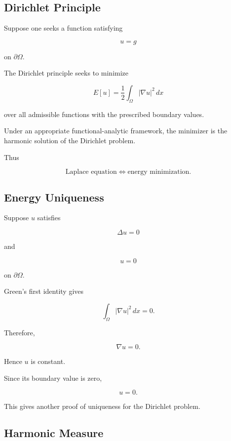 \subsection{Dirichlet Principle}
\label{subsec:potential-dirichlet-principle}

Suppose one seeks a function satisfying

\[
u=g
\]

on \(\partial\Omega\).

The Dirichlet principle seeks to minimize

\[
\boxed{
E[u]
=
\frac12
\int_\Omega
|\nabla u|^2\,dx
}
\]

over all admissible functions with the prescribed boundary values.

Under an appropriate functional-analytic framework, the minimizer is the
harmonic solution of the Dirichlet problem.

Thus

\[
\boxed{
\text{Laplace equation}
\Longleftrightarrow
\text{energy minimization}.
}
\]

\subsection{Energy Uniqueness}
\label{subsec:energy-uniqueness}

Suppose \(u\) satisfies

\[
\Delta u=0
\]

and

\[
u=0
\]

on \(\partial\Omega\).

Green's first identity gives

\[
\int_\Omega
|\nabla u|^2\,dx
=
0.
\]

Therefore,

\[
\nabla u=0.
\]

Hence \(u\) is constant.

Since its boundary value is zero,

\[
\boxed{
u=0.
}
\]

This gives another proof of uniqueness for the Dirichlet problem.

\subsection{Harmonic Measure}
\label{subsec:harmonic-measure}

